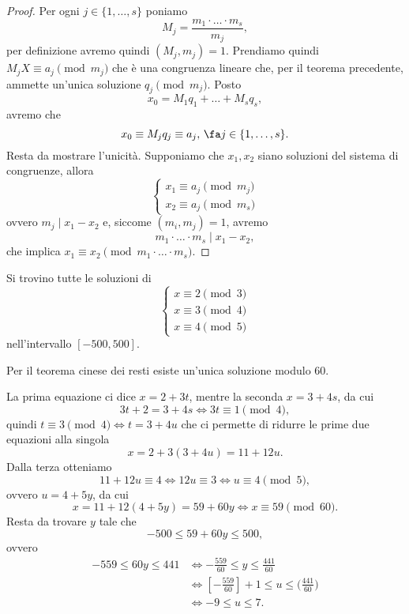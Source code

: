 \begin{proof}
	Per ogni \(j\in\{1,\ldots,s\}\) poniamo
	\[
		M_j = \frac{m_1 \cdot\ldots\cdot m_s}{m_j},
	\]
	per definizione avremo quindi \((M_j,m_j) = 1\).
	Prendiamo quindi \(M_j X \equiv a_j \pmod{m_j}\) che è una congruenza lineare che, per il teorema precedente, ammette un'unica soluzione \(q_j \pmod{m_j}\).
	Posto
	\[
		x_0 = M_1 q_1 + \ldots + M_s q_s,
	\]
	avremo che
	\[
		x_0 \equiv M_j q_j \equiv a_j ,\,\fa j\in\{1, \ldots, s\}.
	\]
	Resta da mostrare l'unicità.
	Supponiamo che \(x_1,x_2\) siano soluzioni del sistema di congruenze, allora
	\[
		\begin{cases}
			x_1 \equiv a_j \pmod{m_j} \\
			x_2 \equiv a_j \pmod{m_s}
		\end{cases}
	\]
	ovvero \(m_j \mid x_1-x_2\) e, siccome \((m_i,m_j) = 1\), avremo
	\[
		m_1 \cdot\ldots\cdot m_s \mid x_1-x_2,
	\]
	che implica \(x_1 \equiv x_2 \pmod{m_1 \cdot\ldots\cdot m_s}\).
\end{proof}

\begin{ese}
	Si trovino tutte le soluzioni di
	\[
		\begin{cases}
			x \equiv 2 \pmod{3} \\
			x \equiv 3 \pmod{4} \\
			x \equiv 4 \pmod{5}
		\end{cases}
	\]
	nell'intervallo \([-500,500]\).
\end{ese}

\begin{sol}
	Per il teorema cinese dei resti esiste un'unica soluzione modulo \(60\).

	La prima equazione ci dice \(x=2+3t\), mentre la seconda \(x=3+4s\), da cui
	\[
		3t+2=3+4s \iff 3t \equiv 1 \pmod{4},
	\]
	quindi \(t \equiv 3 \pmod{4} \iff t=3+4u\) che ci permette di ridurre le prime due equazioni alla singola
	\[
		x = 2+3(3+4u) = 11+12u.
	\]
	Dalla terza otteniamo
	\[
		11+12u \equiv 4 \iff 12 u \equiv 3 \iff u \equiv 4 \pmod{5},
	\]
	ovvero \(u = 4+5y\), da cui
	\[
		x = 11+12(4+5y) = 59+60y \iff x \equiv 59 \pmod{60}.
	\]
	Resta da trovare \(y\) tale che
	\[
		-500 \le 59 + 60y \le 500,
	\]
	ovvero
	\[
		\begin{split}
			-559 \le 60 y \le 441 & \iff -\frac{559}{60} \le y \le \frac{441}{60}\\
			& \iff \left[ -\frac{559}{60} \right]+1 \le u \le \big( \frac{441}{60} \big)\\
			& \iff -9 \le u \le 7.
		\end{split}
	\]
\end{sol}
%
%
